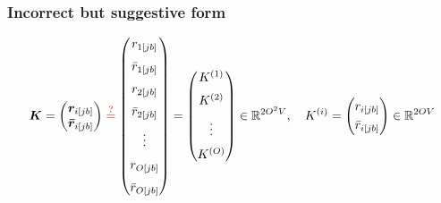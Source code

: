 \subsubsection{Incorrect but suggestive form}
\begin{align}
    \bm{K} = \begin{pmatrix}
\bm{r}_{i[jb]} \\
\bm{\bar{r}}_{i[{jb}]} \\
\end{pmatrix} \color{red} \stackrel{?}{=} \color{black} \begin{pmatrix}
r_{1[jb]} \\[6pt]
\bar{r}_{1[{j} b]} \\[6pt]
r_{2[jb]} \\[6pt]
\bar{r}_{2[{j} b]} \\[6pt]
\vdots \\[6pt]
r_{O[jb]} \\[6pt]
\bar{r}_{O[{j} b]}
\end{pmatrix} = \begin{pmatrix}
K^{(1)} \\[6pt]
K^{(2)} \\[6pt]
\vdots \\[6pt]
K^{(O)}
\end{pmatrix}\in \mathbb{R}^{2O^2V},
\quad
K^{(i)} = \begin{pmatrix}
r_{i[jb]} \\[3pt]
\bar{r}_{i[{j} b]}
\end{pmatrix} \in \mathbb{R}^{2OV}
\end{align} 

